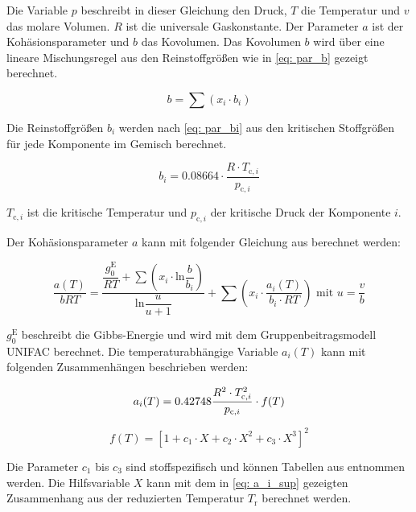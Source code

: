 \documentclass[../thesis.tex]{subfiles}
\begin{document}
Die Variable $ p $ beschreibt in dieser Gleichung den Druck, $ T $ die Temperatur und $ v $ das molare Volumen. $ R $ ist die universale Gaskonstante. Der Parameter $a$ ist der Kohäsionsparameter und $ b $ das Kovolumen. Das Kovolumen $ b $ wird über eine lineare Mischungsregel aus den Reinstoffgrößen wie in \autoref{eq: par_b} gezeigt berechnet.

\begin{equation}
	b = \sum \left( x_i \cdot b_i \right)
	\label{eq: par_b}
\end{equation}

Die Reinstoffgrößen $ b_i $ werden nach \autoref{eq: par_bi} aus den kritischen Stoffgrößen für jede Komponente im Gemisch berechnet.

\begin{equation}
	b_i = 0\text{.}08664 \cdot \dfrac{R \cdot T_{\mathrm{c},i}}{p_{\mathrm{c},i}}
	\label{eq: par_bi}
\end{equation}

$ T_{\mathrm{c},i} $ ist die kritische Temperatur und $ p_{\mathrm{c},i} $ der kritische Druck der Komponente $ i$.

Der Kohäsionsparameter $a$ kann mit folgender Gleichung aus \cite{horstmann2005psrk} berechnet werden:

\begin{equation}
	\dfrac{a(T)}{bRT} =	\dfrac{\dfrac{g^{\mathrm{E}}_0}{RT} +  \sum \left( x_i \cdot \mathrm{ln}\dfrac{b}{b_i} \right)}{\mathrm{ln}\dfrac{u}{u + 1}}
	+ \sum \left( x_i \cdot \dfrac{a_i(T)}{b_i \cdot RT} \right) \text{ mit } u = \dfrac{v}{b}
\end{equation}

$ g^{\mathrm{E}}_0 $ beschreibt die Gibbs-Energie und wird mit dem Gruppenbeitragsmodell UNIFAC \cite{magnussen1981unifac} berechnet. Die temperaturabhängige Variable $a_i(T)$ kann mit folgenden Zusammenhängen beschrieben werden:

\begin{equation}
	a_i(T) = 0\text{.}42748 \dfrac{R^2 \cdot T_{\mathrm{c},i}^2}{p_{\mathrm{c},i}} \cdot f(T) \\
\end{equation}

\begin{equation}
	f(T) = \left[1 + c_1 \cdot X + c_2 \cdot X^2 + c_3 \cdot X^3 \right]^2
\end{equation} 

Die Parameter $ c_1 $ bis $ c_3 $ sind stoffspezifisch und können Tabellen aus \cite{horstmann2005psrk} entnommen werden. Die Hilfsvariable $ X$ kann mit dem in \autoref{eq: a_i_sup} gezeigten Zusammenhang aus der reduzierten Temperatur $T_\mathrm{r}$ berechnet werden.
\end{document}
